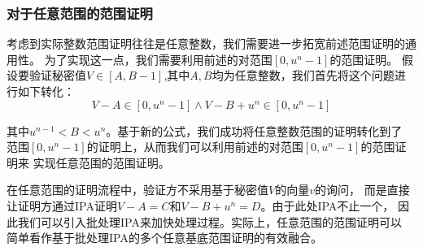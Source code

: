 \documentclass[zihao=-4]{ctexart}
\begin{document}
\begin{spacing}{1.5}
\subsubsection{对于任意范围的范围证明}
考虑到实际整数范围证明往往是任意整数，我们需要进一步拓宽前述范围证明的通用性。
为了实现这一点，我们需要利用前述的对范围$[0,u^n-1]$的范围证明。
假设要验证秘密值$V\in[A,B-1]$,其中$A,B$均为任意整数，我们首先将这个问题进行如下转化：
\begin{equation}V-A\in [0,u^n-1]\wedge V-B+u^n\in [0,u^n-1]\end{equation}\par
其中$u^{n-1}<B<u^n$。基于新的公式，我们成功将任意整数范围的证明转化到了
范围$[0,u^n-1]$的证明上，从而我们可以利用前述的对范围$[0,u^n-1]$的范围证明来
实现任意范围的范围证明。\par
在任意范围的证明流程中，验证方不采用基于秘密值$V$的向量$v$的询问，
而是直接让证明方通过IPA证明$V-A=C$和$V-B+u^n=D$。由于此处IPA不止一个，
因此我们可以引入批处理IPA来加快处理过程。实际上，任意范围的范围证明可以
简单看作基于批处理IPA的多个任意基底范围证明的有效融合。

\end{spacing}
\end{document}
